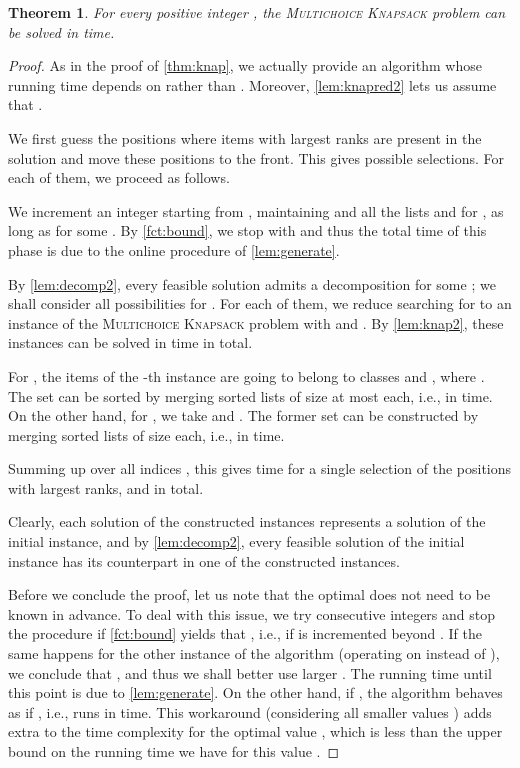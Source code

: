 \documentclass{article}
\theoremstyle{plain}
\newtheorem{theorem}{Theorem}[section]
\theoremstyle{definition}
\newcommand{\MK}{\textsc{Multichoice Knapsack}\xspace}
\begin{document}
   
   \begin{theorem}\label{thm:knap3}
    For every positive integer , the \MK problem can be solved in  time.
  \end{theorem}
  \begin{proof}
  As in the proof of \cref{thm:knap}, we actually provide an algorithm whose running time depends on  rather than .
  Moreover, \cref{lem:knapred2} lets us assume that .   
    
    We first guess the  positions where items with largest ranks  are present in the solution  and move these positions to the front. This gives  possible selections. For each of them, we proceed as follows.
    
    
    We increment an integer  starting from , maintaining  and all the lists  and  for ,
    as long as  for some .
    By \cref{fct:bound}, we stop with  and
    thus the total time of this phase is  due to the online procedure of \cref{lem:generate}.
    
    
    By \cref{lem:decomp2}, every feasible solution   admits a decomposition  for some ;
    we shall consider all possibilities for .
    For each of them, we reduce searching for  to an instance of the \MK  problem with  and . 
    By \cref{lem:knap2}, these instances can be solved in 
    time in total.
   
    For , the items of the -th instance are going to belong to classes  and ,
    where .
    The set  can be sorted by merging  sorted lists of size at most  each,
    i.e., in  time.
    On the other hand, for , we take 
     and .
    The former set can be constructed by merging  sorted lists of size  each,
    i.e., in  time. 
    
    Summing up over all indices , this gives  time
    for a single selection of the  positions with largest ranks,
    and  in total.
       
    Clearly, each solution of the constructed instances represents a solution of the initial instance,
    and by \cref{lem:decomp2}, every feasible solution of the initial instance has its counterpart in one of the constructed instances. 
  
      Before we conclude the proof, let us note that the optimal  does not need to be known in advance. 
    To deal with this issue, we try consecutive integers  and stop the procedure if
    \cref{fct:bound} yields that , i.e., if  is incremented beyond .
    If the same happens for the other instance of the algorithm (operating on  instead of ), we conclude that ,
    and thus we shall better use larger . 
    The running time until this point is  due to \cref{lem:generate}. 
    On the other hand, if , the algorithm behaves as if , i.e., runs in  time.
     This workaround (considering all smaller values ) adds extra 
    to the time complexity for the optimal value , which is less than the upper bound on the running time we have for this value .
      \end{proof}
    
\end{document}

